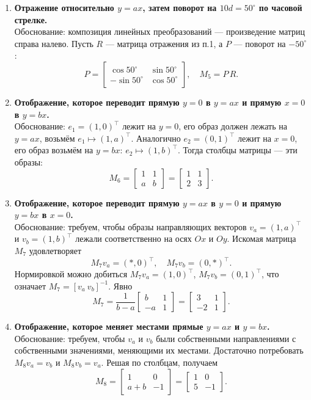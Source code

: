 \begin{enumerate}
  \item \textbf{Отражение относительно $y = ax$, затем поворот на $10d = 50^\circ$ по часовой стрелке.}\\
  Обоснование: композиция линейных преобразований — произведение матриц справа налево. Пусть $R$ — матрица отражения из п.1, а $P$ — поворот на $-50^\circ$:
  \[
    P = \begin{bmatrix}
      \cos 50^\circ & \sin 50^\circ \\
      -\sin 50^\circ & \cos 50^\circ
    \end{bmatrix},\quad M_5 = P\,R.
  \]

  \item \textbf{Отображение, которое переводит прямую $y = 0$ в $y = ax$ и прямую $x = 0$ в $y = bx$.} \\
  Обоснование: $e_1=(1,0)^\top$ лежит на $y=0$, его образ должен лежать на $y=ax$, возьмём $e_1\mapsto (1,a)^\top$. Аналогично $e_2=(0,1)^\top$ лежит на $x=0$, его образ возьмём на $y=bx$: $e_2\mapsto (1,b)^\top$. Тогда столбцы матрицы — эти образы:
  \[
    M_6 = \begin{bmatrix}
      1 & 1 \\
      a & b
    \end{bmatrix} = \begin{bmatrix} 1 & 1 \\ 2 & 3 \end{bmatrix}.
  \]

  \item \textbf{Отображение, которое переводит прямую $y = ax$ в $y = 0$ и прямую $y = bx$ в $x = 0$.}\\
  Обоснование: требуем, чтобы образы направляющих векторов $v_a=(1,a)^\top$ и $v_b=(1,b)^\top$ лежали соответственно на осях $Ox$ и $Oy$. Искомая матрица $M_7$ удовлетворяет
  \[
    M_7 v_a = (\ast,0)^\top,\quad M_7 v_b = (0,\ast)^\top.
  \]
  Нормировкой можно добиться $M_7 v_a = (1,0)^\top$, $M_7 v_b=(0,1)^\top$, что означает $M_7=[v_a\ v_b]^{-1}$. Явно
  \[
    M_7 = \frac{1}{b-a}\begin{bmatrix} b & 1 \\ -a & 1 \end{bmatrix} = \begin{bmatrix} 3 & 1 \\ -2 & 1 \end{bmatrix}.
  \]

  \item \textbf{Отображение, которое меняет местами прямые $y = ax$ и $y = bx$.}\\
  Обоснование: требуем, чтобы $v_a$ и $v_b$ были собственными направлениями с собственными значениями, меняющими их местами. Достаточно потребовать $M_8 v_a = v_b$ и $M_8 v_b = v_a$. Решая по столбцам, получаем
  \[
    M_8 = \begin{bmatrix} 1 & 0 \\ a+b & -1 \end{bmatrix} = \begin{bmatrix} 1 & 0 \\ 5 & -1 \end{bmatrix}.
  \]


\end{enumerate}
